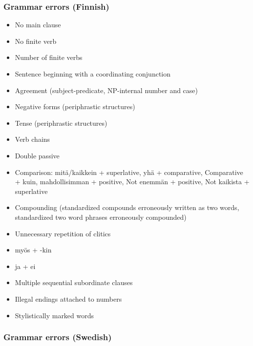 \documentclass[a4paper,english,12pt]{article}
\begin{document}
\begin{spacing}{1.0}
\subsubsection{Grammar errors (Finnish)}
\begin{itemize}
    \item No main clause
    \item No finite verb
    \item Number of finite verbs
    \item Sentence beginning with a coordinating conjunction 
	\item Agreement (subject-predicate, NP-internal number and case)
    \item Negative forms (periphrastic structures)
    \item Tense (periphrastic structures)
    \item Verb chains
    \item Double passive 
	\item Comparison: mitä/kaikkein + superlative, yhä + comparative, Comparative + kuin, mahdollisimman + positive, Not enemmän + positive, Not kaikista + superlative 
	\item Compounding (standardized compounds erroneously written as two words, standardized two word phrases erroneously compounded) 
 	\item Unnecessary repetition of clitics
    \item myös + -kin
    \item ja + ei
    \item Multiple sequential subordinate clauses
    \item Illegal endings attached to numbers
    \item Stylistically marked words
\end{itemize}

\subsubsection{Grammar errors (Swedish)}


\end{spacing}
\end{document}
